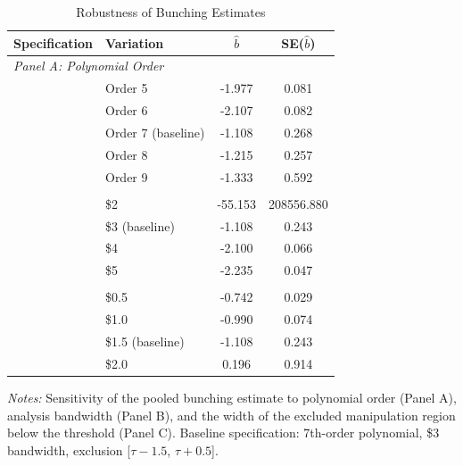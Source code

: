 \begin{table}[t]
\centering
\caption{Robustness of Bunching Estimates}
\label{tab:robustness}
\begin{threeparttable}
\begin{tabular}{llcc}
\toprule
Specification & Variation & $\hat{b}$ & SE($\hat{b}$) \\
\midrule
\multicolumn{4}{l}{\textit{Panel A: Polynomial Order}} \\
\addlinespace
 & Order 5 & -1.977 & 0.081 \\
 & Order 6 & -2.107 & 0.082 \\
 & Order 7 (baseline) & -1.108 & 0.268 \\
 & Order 8 & -1.215 & 0.257 \\
 & Order 9 & -1.333 & 0.592 \\
\addlinespace
\multicolumn{4}{l}{\textit{Panel B: Bandwidth}} \\
\addlinespace
 & \$2 & -55.153 & 208556.880 \\
 & \$3 (baseline) & -1.108 & 0.243 \\
 & \$4 & -2.100 & 0.066 \\
 & \$5 & -2.235 & 0.047 \\
\addlinespace
\multicolumn{4}{l}{\textit{Panel C: Exclusion Region (below threshold)}} \\
\addlinespace
 & \$0.5 & -0.742 & 0.029 \\
 & \$1.0 & -0.990 & 0.074 \\
 & \$1.5 (baseline) & -1.108 & 0.243 \\
 & \$2.0 & 0.196 & 0.914 \\
\bottomrule
\end{tabular}
\begin{tablenotes}
\item \textit{Notes:} Sensitivity of the pooled bunching estimate to polynomial order
(Panel A), analysis bandwidth (Panel B), and the width of the excluded manipulation
region below the threshold (Panel C). Baseline specification: 7th-order polynomial,
\$3 bandwidth, exclusion [$\tau - 1.5$, $\tau + 0.5$].
\end{tablenotes}
\end{threeparttable}
\end{table}


